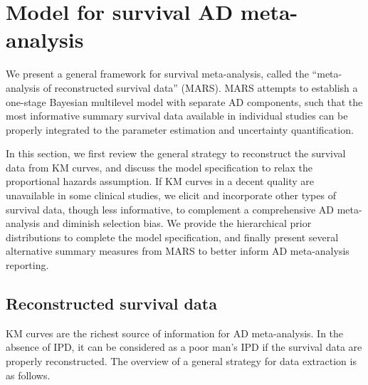 \documentclass[12pt]{article}
\theoremstyle{mystyle}
\begin{document}
\section{Model for survival AD meta-analysis}
\label{sec:3}

We present a general framework for survival meta-analysis, called the “meta-analysis of reconstructed survival data” (MARS). MARS attempts to establish a one-stage Bayesian multilevel model with separate AD components, such that the most informative summary survival data available in individual studies can be properly integrated to the parameter estimation and uncertainty quantification. 

In this section, we first review the general strategy to reconstruct the survival data from KM curves, and discuss the model specification 
to relax the proportional hazards assumption.  If KM curves in a decent quality are unavailable in some clinical studies, we elicit and incorporate other types of survival data, though less informative, to complement a comprehensive AD meta-analysis and diminish selection bias.  We provide the hierarchical prior distributions to complete the model specification, and finally present several alternative summary measures from MARS to better inform AD meta-analysis reporting. 




\subsection{Reconstructed survival data}
\label{subsec:3:1}

KM curves are the richest source of information for AD meta-analysis. In the absence of IPD, it can be considered as a poor man's IPD if the survival data are properly reconstructed. The overview of a general strategy for data extraction is as follows.
\end{document}
